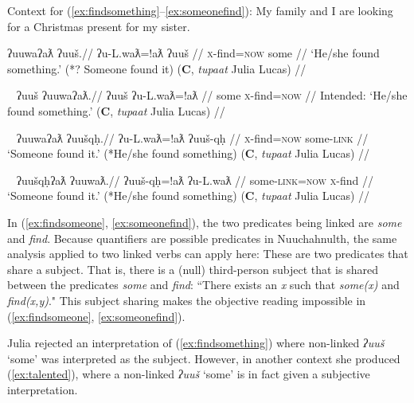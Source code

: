 \vspace{5pt}

\noindent Context for (\ref{ex:findsomething}--\ref{ex:someonefind}): My family and I are looking for a Christmas present for my sister.

\ex \label{ex:findsomething}
\begingl
\glpreamble ʔuuwaʔaƛ ʔuuš.//
\gla ʔu-L.waƛ=!aƛ ʔuuš //
\glb \textsc{x}-find=\textsc{now} some //
\glft `He/she found something.' (*? Someone found it) (\textbf{C}, \textit{tupaat} Julia Lucas) //
\endgl
\xe

\ex~ \label{ex:*findsomething}
\begingl
\glpreamble *ʔuuš ʔuuwaʔaƛ.//
\gla ʔuuš ʔu-L.waƛ=!aƛ //
\glb some \textsc{x}-find=\textsc{now} //
\glft Intended: `He/she found something.' (\textbf{C}, \textit{tupaat} Julia Lucas) //
\endgl
\xe

\ex~ \label{ex:findsomeone}
\begingl
\glpreamble ʔuuwaʔaƛ ʔuušqḥ.//
\gla ʔu-L.waƛ=!aƛ ʔuuš-qḥ //
\glb \textsc{x}-find=\textsc{now} some-\textsc{link} //
\glft `Someone found it.' (*He/she found something) (\textbf{C}, \textit{tupaat} Julia Lucas) //
\endgl
\xe

\ex~ \label{ex:someonefind}
\begingl
\glpreamble ʔuušqḥʔaƛ ʔuuwaƛ.//
\gla ʔuuš-qḥ=!aƛ ʔu-L.waƛ //
\glb some-\textsc{link}=\textsc{now} \textsc{x}-find //
\glft `Someone found it.' (*He/she found something) (\textbf{C}, \textit{tupaat} Julia Lucas) //
\endgl
\xe

\begin{comment}
\ex \label{ex:someonefind2}
\begingl
\glpreamble ʔuušqḥ ʔuuwaʔaƛ.//
\gla ʔuuš-qḥ ʔu-L.waƛ=!aƛ //
\glb some-\textsc{link} \textsc{x}-find=\textsc{now} //
\glft `Someone found it.' (*He/she found something) //
\endgl
\xe
\end{comment}

In (\ref{ex:findsomeone}, \ref{ex:someonefind}), the two predicates being linked are \textit{some} and \textit{find}. Because quantifiers are possible predicates in Nuuchahnulth, the same analysis applied to two linked verbs can apply here: These are two predicates that share a subject. That is, there is a (null) third-person subject that is shared between the predicates \textit{some} and \textit{find}: ``There exists an \textit{x} such that \textit{some(x)} and \textit{find(x,y)}." This subject sharing makes the objective reading impossible in (\ref{ex:findsomeone}, \ref{ex:someonefind}).

Julia rejected an interpretation of (\ref{ex:findsomething}) where non-linked \textit{ʔuuš} `some' was interpreted as the subject. However, in another context she produced (\ref{ex:talented}), where a non-linked \textit{ʔuuš} `some' is in fact given a subjective interpretation.

